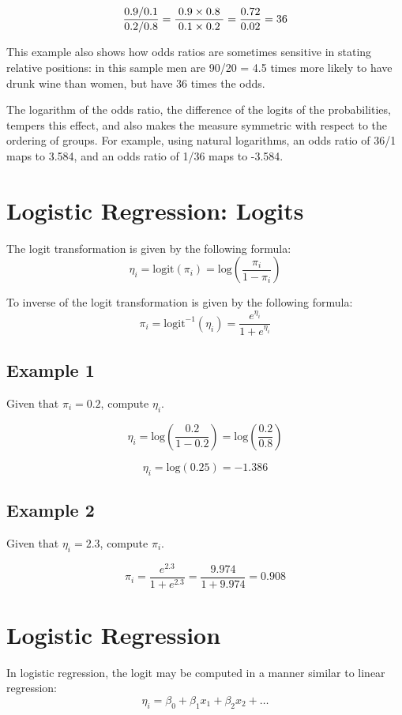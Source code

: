 \[ { 0.9/0.1 \over 0.2/0.8}=\frac{\;0.9\times 0.8\;}{\;0.1\times 0.2\;} ={0.72 \over 0.02} = 36 \]

This example also shows how odds ratios are sometimes sensitive in stating relative positions: in this sample men are 90/20 = 4.5 times more likely to have drunk wine than women, but have 36 times the odds. 


The logarithm of the odds ratio, the difference of the logits of the probabilities, tempers this effect, and also makes the measure symmetric with respect to the ordering of groups. For example, using natural logarithms, an odds ratio of 36/1 maps to 3.584, and an odds ratio of 1/36 maps to -3.584.


\section{Logistic Regression: Logits}

The logit transformation is given by the following formula: 
\[ \eta_i = \mbox{logit}(\pi_i)  = \mbox{log}\left( \frac{\pi_i}{1- \pi_i} \right) \]

To inverse of the logit transformation is given by the following formula: 
\[ \pi_i = \mbox{logit}^{-1}(\eta_i)  =  \frac{e^{\eta_i}}{1 + e^{\eta_i}} \]

\subsection{Example 1}
Given that $\pi_i = 0.2$, compute $\eta_i$.

\[ \eta_i = \mbox{log}\left( \frac{0.2}{1-0.2} \right)= \mbox{log}\left( \frac{0.2}{0.8} \right)\] 

\[ \eta_i =  \mbox{log}(0.25) =-1.386 \]

\subsection{Example 2}
Given that $\eta_i = 2.3$, compute $\pi_i$.

\[ \pi_i  =  \frac{e^{2.3}}{1 + e^{2.3}} = \frac{9.974}{1 + 9.974} = 0.908 \]

\section{Logistic Regression}
In logistic regression, the logit may be computed in a manner similar to linear regression:
\[ \eta_i = \beta_0 + \beta_1x_1 + \beta_2x_2 + \ldots  \]

